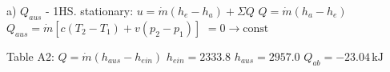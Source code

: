 a) \( Q_{aus} \)  
- 1HS. stationary: \( u = \dot{m}(h_e - h_a) + \Sigma Q \)  
\( Q = \dot{m}(h_a - h_e) \)  
\( Q_{aus} = \dot{m}[c(T_2 - T_1) + v(p_2 - p_1)] \)  
\( = 0 \rightarrow \text{const} \)  

Table A2: \( Q = \dot{m}(h_{aus} - h_{ein}) \)  
\( h_{ein} = 2333.8 \)  
\( h_{aus} = 2957.0 \)  
\( Q_{ab} = -23.04 \, \text{kJ} \)